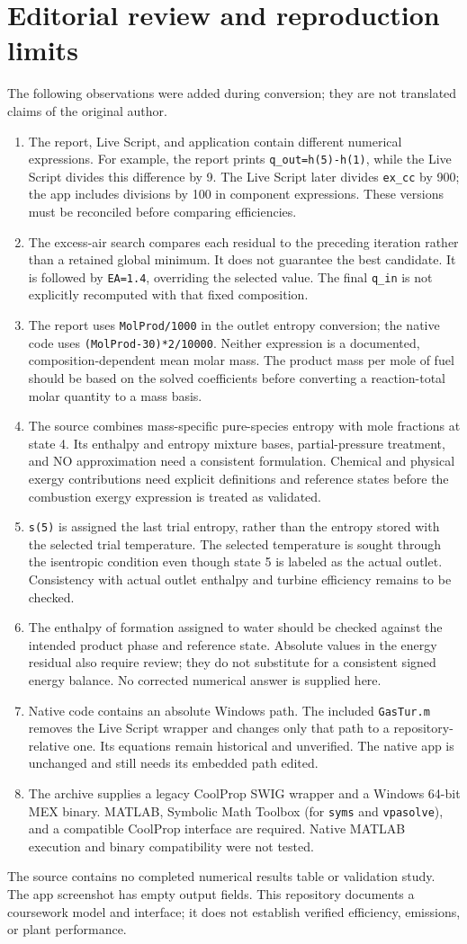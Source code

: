 \documentclass[11pt,a4paper]{article}
\begin{document}
\section{Editorial review and reproduction limits}\label{sec:review}
The following observations were added during conversion; they are not translated claims of the original author.
\begin{enumerate}
\item The report, Live Script, and application contain different numerical expressions. For example, the report prints \texttt{q\_out=h(5)-h(1)}, while the Live Script divides this difference by 9. The Live Script later divides \texttt{ex\_cc} by 900; the app includes divisions by 100 in component expressions. These versions must be reconciled before comparing efficiencies.
\item The excess-air search compares each residual to the preceding iteration rather than a retained global minimum. It does not guarantee the best candidate. It is followed by \texttt{EA=1.4}, overriding the selected value. The final \texttt{q\_in} is not explicitly recomputed with that fixed composition.
\item The report uses \texttt{MolProd/1000} in the outlet entropy conversion; the native code uses \texttt{(MolProd-30)*2/10000}. Neither expression is a documented, composition-dependent mean molar mass. The product mass per mole of fuel should be based on the solved coefficients before converting a reaction-total molar quantity to a mass basis.
\item The source combines mass-specific pure-species entropy with mole fractions at state 4. Its enthalpy and entropy mixture bases, partial-pressure treatment, and NO approximation need a consistent formulation. Chemical and physical exergy contributions need explicit definitions and reference states before the combustion exergy expression is treated as validated.
\item \texttt{s(5)} is assigned the last trial entropy, rather than the entropy stored with the selected trial temperature. The selected temperature is sought through the isentropic condition even though state 5 is labeled as the actual outlet. Consistency with actual outlet enthalpy and turbine efficiency remains to be checked.
\item The enthalpy of formation assigned to water should be checked against the intended product phase and reference state. Absolute values in the energy residual also require review; they do not substitute for a consistent signed energy balance. No corrected numerical answer is supplied here.
\item Native code contains an absolute Windows path. The included \texttt{GasTur.m} removes the Live Script wrapper and changes only that path to a repository-relative one. Its equations remain historical and unverified. The native app is unchanged and still needs its embedded path edited.
\item The archive supplies a legacy CoolProp SWIG wrapper and a Windows 64-bit MEX binary. MATLAB, Symbolic Math Toolbox (for \texttt{syms} and \texttt{vpasolve}), and a compatible CoolProp interface are required. Native MATLAB execution and binary compatibility were not tested.
\end{enumerate}
The source contains no completed numerical results table or validation study. The app screenshot has empty output fields. This repository documents a coursework model and interface; it does not establish verified efficiency, emissions, or plant performance.
\end{document}
